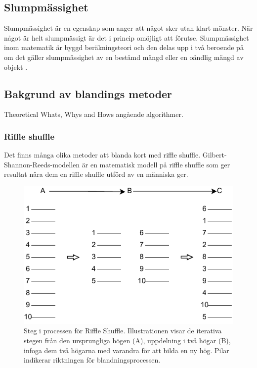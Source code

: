 \documentclass[swedish,a4paper]{article}
\begin{document}
\subsection{Slumpmässighet}
\label{sec:slump}

Slumpmässighet är en egenskap som anger att något sker utan klart mönster. När
något är helt slumpmässigt är det i princip omöjligt att förutse. Slumpmässighet
inom matematik är byggd beräknings\-teori och den delas upp i två beroende på om
det gäller slumpmässighet av en bestämd mängd eller en oändlig mängd av objekt
\parencite[49-66]{Terwijn2016}.

\subsection{Bakgrund av blandings metoder}
Theoretical Whats, Whys and Hows angående algorithmer.

\subsubsection{Riffle shuffle}
\label{sec:riffle_shuffle}
Det finns många olika metoder att blanda kort med riffle shuffle.
Gilbert-Shannon-Reeds-modellen är en matematisk modell på riffle shuffle som ger
resultat nära dem en riffle shuffle utförd av en människa ger.

\begin{figure}[H]
	\begin{center}
		\includegraphics{images/rifflle-shuffle.pdf}
	\end{center}
	\captionsetup{justification=centering,margin=2cm}
	\caption{Steg i processen för Riffle Shuffle. Illustrationen visar de
	iterativa stegen från den ursprungliga högen (A), uppdelning i två
	högar (B), infoga dem två högarna med varandra för att bilda en ny hög.
        Pilar indikerar riktningen för blandningsprocessen.}
	\label{fig:riffle_shuffle_1}
\end{figure}
\end{document}
